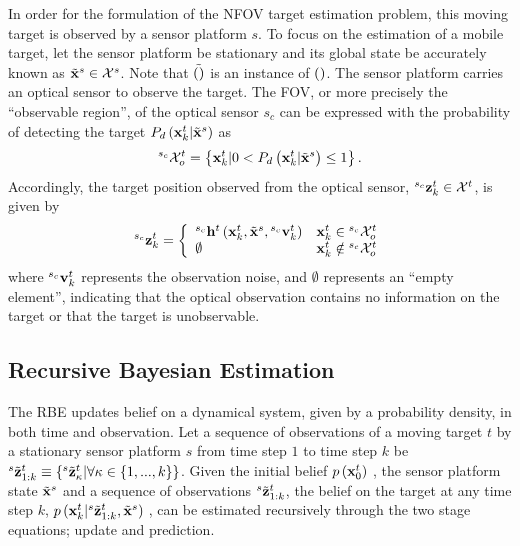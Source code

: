 In order for the formulation of the NFOV target estimation problem, this moving target is observed by a sensor platform $s$.  To focus on the estimation of a mobile target, let the sensor platform be stationary and its global state be accurately known as $\tilde {\mathbf{x}}^{s} \in \mathcal{X}^s$.  Note that $\tilde{\left (  \right )}$ is an instance of $\left (  \right )$.  The sensor platform carries an optical sensor to observe the target.  The FOV, or more precisely the ``observable region'', of the optical sensor $s_c$ can be expressed with the probability of detecting the target $P_d\left ( \mathbf{x}_{k}^{t}|\tilde {\mathbf{x}}^{s} \right )$ as
\begin{equation}
{}^{s_c}\mathcal{X}_o^t = \left \{ \mathbf{x}_{k}^{t}|0 < P_d\left ( \mathbf{x}_{k}^{t}|\tilde {\mathbf{x}}^{s} \right ) \leq 1 \right \}.  \nonumber
\end{equation}
Accordingly, the target position observed from the optical sensor, ${}^{s_c}\mathbf{z}_{k}^{t} \in \mathcal{X}^t$, is given by
\begin{equation}\label{eq:sensor_model}
{}^{s_c}\mathbf{z}_{k}^{t} = \left\{
\begin{array}{ll}
{}^{s_c}\mathbf{h}^{t} \left ( \mathbf{x}_{k}^{t},\tilde {\mathbf{x}}^{s},{}^{s_c}\mathbf{v}_{k}^{t} \right ) & \mathbf{x}_{k}^{t} \in {}^{s_c}\mathcal{X}_o^{t} \\
\emptyset & \mathbf{x}_{k}^{t} \notin {}^{s_c}\mathcal{X}_o^{t}
\end{array}
\right.
\end{equation}
where ${}^{s_c}\mathbf{v}_{k}^{t}$ represents the observation noise, and $\emptyset$ represents an ``empty element'', indicating that the optical observation contains no information on the target or that the target is unobservable. 


\subsection{Recursive Bayesian Estimation}
The RBE updates belief on a dynamical system, given by a probability density, in both time and observation. Let a sequence of observations of a moving target $t$ by a stationary sensor platform $s$ from time step $1$ to time step $k$ be ${}^{s}\tilde {\mathbf{z}}_{1:k}^{t} \equiv \left \{ {}^{s}\tilde {\mathbf{z}}_{\kappa}^{t}|\forall \kappa \in \left \{ 1,...,k \right \} \right \}$.  Given the initial belief $\mbox{$ {p} \left ( \mathbf{x}_{0}^{t} \right )$ }$, the sensor platform state $\tilde {\mathbf{x}}^{s}$ and a sequence of observations ${}^{s}\tilde {\mathbf{z}}_{1:k}^{t}$, the belief on the target at any time step $k$, $\mbox{$ {p} \left ( \mathbf{x}_{k}^{t}|{}^{s}\tilde {\mathbf{z}}_{1:k}^{t},\tilde {\mathbf{x}}^{s} \right )$ }$, can be estimated recursively through the two stage equations; update and prediction.  

